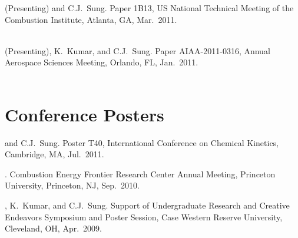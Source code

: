 \begin{bibmune}
\item {} (Presenting) and C.J.\ Sung.
         Paper 1B13,   US National Technical
        Meeting of the Combustion Institute, Atlanta, GA, Mar.\ 2011.\\
        \\

\item {} (Presenting), K.\ Kumar, and C.J.\ Sung.
         Paper AIAA-2011-0316,
         Annual Aerospace Sciences Meeting,
        Orlando, FL, Jan.\ 2011.\\
        \\
\end{bibmune}

\section{{\sectionfont Conference Posters}}

\begin{bibmune}
\item {} and C.J.\ Sung.  Poster T40,  International
        Conference on Chemical Kinetics, Cambridge, MA, Jul.\ 2011.\\

\item {}. 
         Combustion Energy Frontier Research Center
        Annual Meeting, Princeton University, Princeton, NJ,
        Sep.\ 2010.\\

\item {}, K.\ Kumar, and C.J.\ Sung.  Support of Undergraduate
        Research and Creative Endeavors Symposium and Poster Session,
        Case Western Reserve University, Cleveland, OH, Apr.\ 2009.\\
\end{bibmune}

